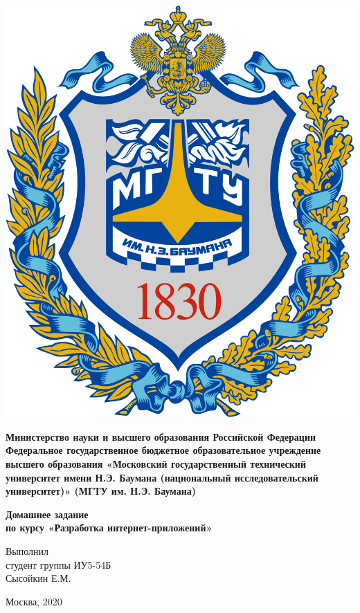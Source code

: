 \documentclass[20pt,a4paper]{report}
\begin{document}
	\begin{titlepage}
		\begin{minipage}{0.3\textwidth}
		\includegraphics[scale=0.03]{logo.png}	
		\end{minipage}
		\begin{minipage}{0.6\textwidth}\centering
			\textbf{
				Министерство науки и высшего образования Российской Федерации
				Федеральное государственное бюджетное образовательное 
				учреждение высшего образования
				«Московский государственный технический университет
				имени Н.Э. Баумана (национальный исследовательский университет)»
				(МГТУ им. Н.Э. Баумана)
			}	
		\end{minipage}
	
		\vspace{5cm}
		\centering
		\Large
		\textbf{
			Домашнее задание \\
			по курсу «Разработка интернет-приложений» \\
		}

		\vspace{6cm}
		\begin{flushright}
			Выполнил \\ 
			студент группы ИУ5-54Б \\ 
			Сысойкин Е.М. 
		\end{flushright}
		\vspace{5cm}
		Москва, 2020
	\end{titlepage}
\end{document}
